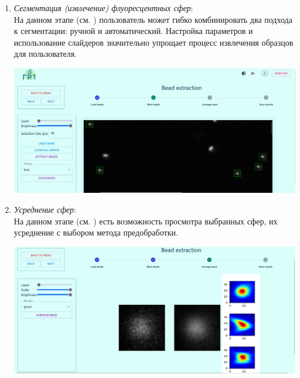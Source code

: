 \begin{enumerate}[]
	\item \textit{Сегментация (извлечение) флуоресцентных сфер}:\\
	На данном этапе (см. ) пользователь может гибко комбинировать два подхода к сегментации: ручной и автоматический. Настройка параметров и использование слайдеров значительно упрощает процесс извлечения образцов для пользователя.\\
	\begin{minipage}{\textwidth}
		\centering
		\vspace{\mfloatsep} %
		\includegraphics[keepaspectratio=true,scale=0.35] {my_folder/images/online_service/steper_extractor.png}
		\label{fig:bead-stepper}  
		\vspace{\mfloatsep} %
	\end{minipage}
\item \textit{Усреднение сфер}:\\
На данном этапе (см. ) есть возможность просмотра выбранных сфер, их усреднение с выбором метода предобработки.\\
\begin{minipage}{\textwidth}
	\centering
	\vspace{\mfloatsep} %
	\includegraphics[keepaspectratio=true,scale=0.3] {my_folder/images/online_service/averaging_bead.png}

\end{minipage}
\end{enumerate}

